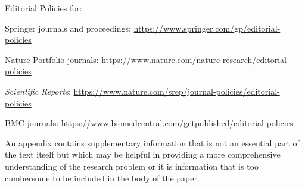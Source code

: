 \documentclass[pdflatex,sn-mathphys-num,iicol]{sn-jnl}
\theoremstyle{thmstyleone}%
\theoremstyle{thmstyletwo}%
\theoremstyle{thmstylethree}%
\begin{document}
\bigskip
\begin{flushleft}%
Editorial Policies for:

\bigskip\noindent
Springer journals and proceedings: \url{https://www.springer.com/gp/editorial-policies}

\bigskip\noindent
Nature Portfolio journals: \url{https://www.nature.com/nature-research/editorial-policies}

\bigskip\noindent
\textit{Scientific Reports}: \url{https://www.nature.com/srep/journal-policies/editorial-policies}

\bigskip\noindent
BMC journals: \url{https://www.biomedcentral.com/getpublished/editorial-policies}
\end{flushleft}



An appendix contains supplementary information that is not an essential part of the text itself but which may be helpful in providing a more comprehensive understanding of the research problem or it is information that is too cumbersome to be included in the body of the paper.






\end{document}
